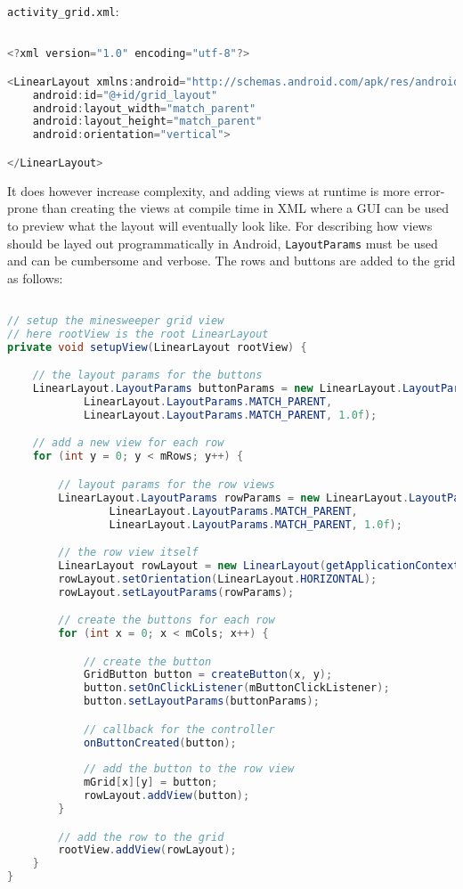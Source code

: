 \texttt{activity\_grid.xml}:
\begin{lstlisting}[language=Java]

<?xml version="1.0" encoding="utf-8"?>

<LinearLayout xmlns:android="http://schemas.android.com/apk/res/android"
    android:id="@+id/grid_layout"
    android:layout_width="match_parent"
    android:layout_height="match_parent"
    android:orientation="vertical">

</LinearLayout>

\end{lstlisting}

It does however increase complexity, and adding views at runtime is more
error-prone than creating the views at compile time in XML where a GUI can be
used to preview what the layout will eventually look like. For describing how
views should be layed out programmatically in Android, \texttt{LayoutParams}
must be used and can be cumbersome and verbose. The rows and buttons are added
to the grid as follows:

\begin{lstlisting}[language=Java]

// setup the minesweeper grid view
// here rootView is the root LinearLayout
private void setupView(LinearLayout rootView) {

    // the layout params for the buttons
    LinearLayout.LayoutParams buttonParams = new LinearLayout.LayoutParams(
            LinearLayout.LayoutParams.MATCH_PARENT,
            LinearLayout.LayoutParams.MATCH_PARENT, 1.0f);

    // add a new view for each row
    for (int y = 0; y < mRows; y++) {

        // layout params for the row views
        LinearLayout.LayoutParams rowParams = new LinearLayout.LayoutParams(
                LinearLayout.LayoutParams.MATCH_PARENT,
                LinearLayout.LayoutParams.MATCH_PARENT, 1.0f);

        // the row view itself
        LinearLayout rowLayout = new LinearLayout(getApplicationContext());
        rowLayout.setOrientation(LinearLayout.HORIZONTAL);
        rowLayout.setLayoutParams(rowParams);

        // create the buttons for each row
        for (int x = 0; x < mCols; x++) {

            // create the button
            GridButton button = createButton(x, y);
            button.setOnClickListener(mButtonClickListener);
            button.setLayoutParams(buttonParams);

            // callback for the controller
            onButtonCreated(button);
            
            // add the button to the row view
            mGrid[x][y] = button;
            rowLayout.addView(button);
        }

        // add the row to the grid
        rootView.addView(rowLayout);
    }
}

\end{lstlisting}

